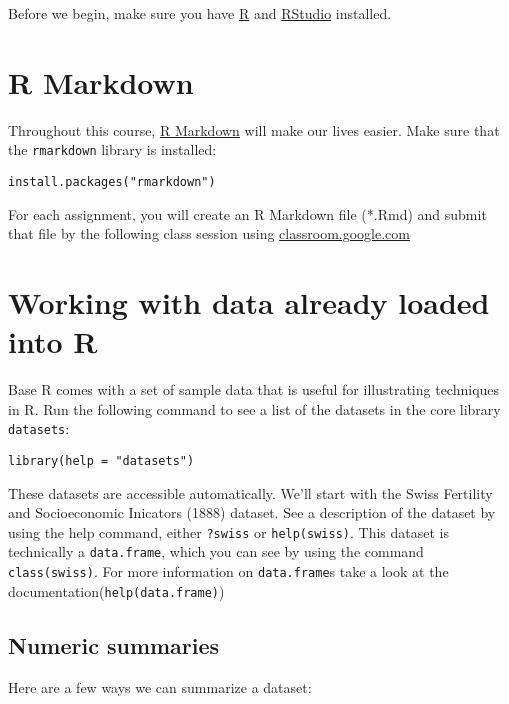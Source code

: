 \documentclass[]{book}
\theoremstyle{definition}
\theoremstyle{definition}
\theoremstyle{remark}
\begin{document}
Before we begin, make sure you have
\href{https://cran.r-project.org/}{R} and
\href{https://www.rstudio.com/products/rstudio/download3/\#download}{RStudio}
installed.

\section{R Markdown}\label{r-markdown}

Throughout this course,
\href{http://rmarkdown.rstudio.com/lesson-1.html}{R Markdown} will make
our lives easier. Make sure that the \texttt{rmarkdown} library is
installed:

\begin{verbatim}
install.packages("rmarkdown")
\end{verbatim}

For each assignment, you will create an R Markdown file (*.Rmd) and
submit that file by the following class session using
\href{https://classroom.google.com}{classroom.google.com}

\section{Working with data already loaded into
R}\label{working-with-data-already-loaded-into-r}

Base R comes with a set of sample data that is useful for illustrating
techniques in R. Run the following command to see a list of the datasets
in the core library \texttt{datasets}:

\begin{verbatim}
library(help = "datasets")
\end{verbatim}

These datasets are accessible automatically. We'll start with the Swiss
Fertility and Socioeconomic Inicators (1888) dataset. See a description
of the dataset by using the help command, either \texttt{?swiss} or
\texttt{help(swiss)}. This dataset is technically a \texttt{data.frame},
which you can see by using the command \texttt{class(swiss)}. For more
information on \texttt{data.frame}s take a look at the
documentation(\texttt{help(data.frame)})

\subsection{Numeric summaries}\label{numeric-summaries}

Here are a few ways we can summarize a dataset:
\end{document}
